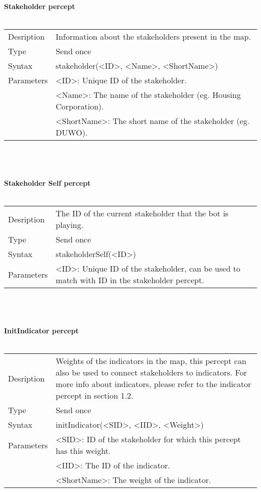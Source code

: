 \documentclass[english,11pt]{report}
\begin{document}
\textbf{Stakeholder percept}\\
\\
\begin{tabularx}{\textwidth}{lX}
 Desription & Information about the stakeholders present in the map. \\
 Type & Send once \\
 Syntax & stakeholder(<ID>, <Name>, <ShortName>) \\
 Parameters &   <ID>: Unique ID of the stakeholder.\\
            &   <Name>: The name of the stakeholder (eg. Housing Corporation).\\
            &   <ShortName>: The short name of the stakeholder (eg. DUWO).
\end{tabularx}\\
\\
\\
\textbf{Stakeholder Self percept}\\
\\
\begin{tabularx}{\textwidth}{lX}
 Desription & The ID of the current stakeholder that the bot is playing. \\
 Type & Send once \\
 Syntax & stakeholderSelf(<ID>) \\
 Parameters &   <ID>: Unique ID of the stakeholder, can be used to match with ID in the stakeholder percept.
\end{tabularx}\\
\\
\\
\textbf{InitIndicator percept}\\
\\
\begin{tabularx}{\textwidth}{lX}
 Desription & Weights of the indicators in the map, this percept can also be used to connect stakeholders to indicators. For more info about indicators, please refer to the indicator percept in section 1.2. \\
 Type & Send once \\
 Syntax & initIndicator(<SID>, <IID>, <Weight>) \\
 Parameters &   <SID>: ID of the stakeholder for which this percept has this weight.\\
            &   <IID>: The ID of the indicator.\\
            &   <ShortName>: The weight of the indicator.
\end{tabularx}
\end{document}
